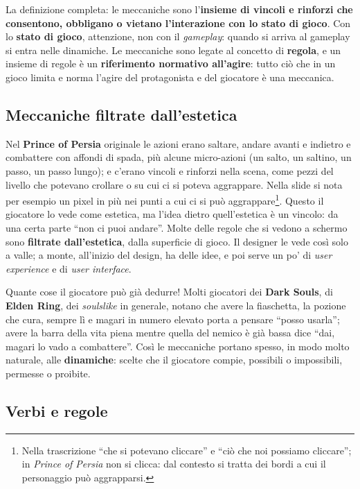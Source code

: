 La definizione completa: le meccaniche sono l'\textbf{insieme di vincoli e
rinforzi che consentono, obbligano o vietano l'interazione con lo stato di
gioco}. Con lo \textbf{stato di gioco}, attenzione, non con il \emph{gameplay}:
quando si arriva al gameplay si entra nelle dinamiche. Le meccaniche sono legate
al concetto di \textbf{regola}, e un insieme di regole è un \textbf{riferimento
normativo all'agire}: tutto ciò che in un gioco limita e norma l'agire del
protagonista e del giocatore è una meccanica.

\subsection{Meccaniche filtrate dall'estetica}

Nel \textbf{Prince of Persia} originale le azioni erano saltare, andare avanti e
indietro e combattere con affondi di spada, più alcune micro-azioni (un salto,
un saltino, un passo, un passo lungo); e c'erano vincoli e rinforzi nella scena,
come pezzi del livello che potevano crollare o su cui ci si poteva aggrappare.
Nella slide si nota per esempio un pixel in più nei punti a cui ci si può
aggrappare\footnote{Nella trascrizione ``che si potevano cliccare'' e ``ciò che
noi possiamo cliccare''; in \emph{Prince of Persia} non si clicca: dal contesto
si tratta dei bordi a cui il personaggio può aggrapparsi.}. Questo il giocatore lo
vede come estetica, ma l'idea dietro quell'estetica è un vincolo: da una certa
parte ``non ci puoi andare''. Molte delle regole che si vedono a schermo sono
\textbf{filtrate dall'estetica}, dalla superficie di gioco. Il designer le vede
così solo a valle; a monte, all'inizio del design, ha delle idee, e poi serve un
po' di \emph{user experience} e di \emph{user interface}.

Quante cose il giocatore può già dedurre! Molti giocatori dei \textbf{Dark Souls},
di \textbf{Elden Ring}, dei \emph{soulslike} in generale, notano che avere la
fiaschetta, la pozione che cura, sempre lì e magari in numero elevato porta a
pensare ``posso usarla''; avere la barra della vita piena mentre quella del
nemico è già bassa dice ``dai, magari lo vado a combattere''. Così le meccaniche
portano spesso, in modo molto naturale, alle \textbf{dinamiche}: scelte che il
giocatore compie, possibili o impossibili, permesse o proibite.

\subsection{Verbi e regole}

